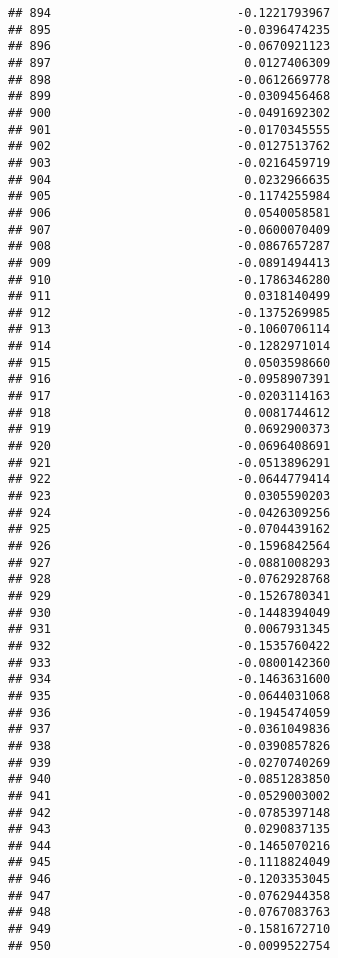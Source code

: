 \documentclass[
]{article}
\begin{document}
\begin{verbatim}
## 894                          -0.1221793967
## 895                          -0.0396474235
## 896                          -0.0670921123
## 897                           0.0127406309
## 898                          -0.0612669778
## 899                          -0.0309456468
## 900                          -0.0491692302
## 901                          -0.0170345555
## 902                          -0.0127513762
## 903                          -0.0216459719
## 904                           0.0232966635
## 905                          -0.1174255984
## 906                           0.0540058581
## 907                          -0.0600070409
## 908                          -0.0867657287
## 909                          -0.0891494413
## 910                          -0.1786346280
## 911                           0.0318140499
## 912                          -0.1375269985
## 913                          -0.1060706114
## 914                          -0.1282971014
## 915                           0.0503598660
## 916                          -0.0958907391
## 917                          -0.0203114163
## 918                           0.0081744612
## 919                           0.0692900373
## 920                          -0.0696408691
## 921                          -0.0513896291
## 922                          -0.0644779414
## 923                           0.0305590203
## 924                          -0.0426309256
## 925                          -0.0704439162
## 926                          -0.1596842564
## 927                          -0.0881008293
## 928                          -0.0762928768
## 929                          -0.1526780341
## 930                          -0.1448394049
## 931                           0.0067931345
## 932                          -0.1535760422
## 933                          -0.0800142360
## 934                          -0.1463631600
## 935                          -0.0644031068
## 936                          -0.1945474059
## 937                          -0.0361049836
## 938                          -0.0390857826
## 939                          -0.0270740269
## 940                          -0.0851283850
## 941                          -0.0529003002
## 942                          -0.0785397148
## 943                           0.0290837135
## 944                          -0.1465070216
## 945                          -0.1118824049
## 946                          -0.1203353045
## 947                          -0.0762944358
## 948                          -0.0767083763
## 949                          -0.1581672710
## 950                          -0.0099522754

\end{verbatim}
\end{document}

